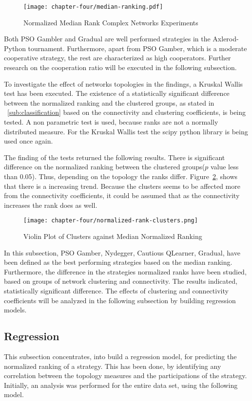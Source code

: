 \begin{figure}[!hbtp]
	\texttt{[image: chapter-four/median-ranking.pdf]}
	\caption{Normalized Median Rank Complex Networks Experiments}
	\label{fig:ranking-second-gen}
\end{figure}

Both PSO Gambler and Gradual are well performed strategies in the Axlerod-Python
tournament. Furthermore, apart from PSO Gamber, which is a moderate cooperative
strategy, the rest are characterized as high cooperators. Further research on
the cooperation ratio will be executed in the following subsection.

To investigate the effect of networks topologies in the findings, a Kruskal Wallis test
has been executed. The existence of a statistically significant difference between
the normalized ranking and the clustered groups, as stated in ~\autoref{sub:classification} based on the
connectivity and clustering coefficients, is being tested. A non parametric test
is used, because ranks are not a normally distributed measure. For the Kruskal Wallis
test the scipy python library is being used once again.

The finding of the tests returned the following results. There is significant
difference on the normalized ranking between the clustered groups(\(p\)
value less than 0.05). Thus, depending on the topology the ranks differ.
Figure~\ref{fig:variation-clusters}, shows that there is a increasing trend.
Because the clusters seems to be affected more from the connectivity coefficients,
it could be assumed that as the connectivity increases the rank does as well.

\begin{figure}[!hbtp]
	\texttt{[image: chapter-four/normalized-rank-clusters.png]}
	\caption{Violin Plot of Clusters against Median Normalized Ranking}
	\label{fig:variation-clusters}
\end{figure}

In this subsection, PSO Gamber, Nydegger, Cautious QLearner, Gradual, have been
defined as the best performing strategies based on the median ranking.
Furthermore, the difference in the strategies normalized ranks have been studied,
based on groups of network clustering and connectivity. The results indicated,
statistically significant difference. The effects of clustering and connectivity
coefficients will be analyzed in the following subsection by building regression
models.

\subsection{Regression}
This subsection concentrates, into build a regression model, for predicting
the normalized ranking of a strategy. This has been done, by identifying any
correlation between the topology measures and the participations of the strategy.
Initially, an analysis was performed for the entire data set, using the following
model.

